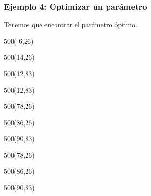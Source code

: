 \documentclass[aspectratio=169]{beamer}
\begin{document}
\begin{frame}[fragile,t]
    \frametitle{ \vspace{-1cm} \flushright \colorbox{verdeuca}{ \small \textcolor{white}{ \footnotesize \secname } }\\
    Ejemplo 4: Optimizar un parámetro}
    Tenemos que encontrar el parámetro óptimo.\\
    \begin{textblock}{500}( 6,26)  \end{textblock}
    \begin{textblock}{500}(14,26)    \end{textblock}
    \begin{textblock}{500}(12,83)  \end{textblock}
    \begin{textblock}{500}(12,83)  \end{textblock}
    \begin{textblock}{500}(78,26)  \end{textblock}
    \begin{textblock}{500}(86,26)  \end{textblock}
    \begin{textblock}{500}(90,83)  \end{textblock}
    \begin{textblock}{500}(78,26)  \end{textblock}
    \begin{textblock}{500}(86,26)  \end{textblock}
    \begin{textblock}{500}(90,83)  \end{textblock}
\end{frame}
\end{document}
